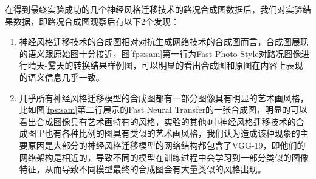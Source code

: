 在得到最终实验成功的几个神经风格迁移技术的路况合成图数据后，我们对实验结果数据，即路况合成图观察后有以下2个发现：
\begin{enumerate}
    \item 神经风格迁移技术的合成图相对对抗生成网络技术的合成图而言，合成图展现的语义跟原始图十分接近，图\ref{fps:sam}第一行为Fast Photo Style对路况图像进行晴天-雾天的转换结果样例图，可以明显的看出合成图和原图在内容上表现的语义信息几乎一致。
    \item 几乎所有神经风格迁移模型的合成图都有一部分图像具有明显的艺术画风格，比如图\ref{fps:sam}第二行展示的Fast Neural Transfer的一张合成图，明显的可以看出合成图像具有艺术画特有的风格，实验的其他4中神经风格迁移技术的合成图里也有各种比例的图具有类似的艺术画风格，我们认为造成该种现象的主要原因是大部分的神经风格迁移模型的网络结构都包含了VGG-19，即他们的网络架构是相近的，导致不同的模型在训练过程中会学习到一部分类似的图像特征，从而导致不同模型最终的合成图会有大量类似的风格出现。
\end{enumerate}
